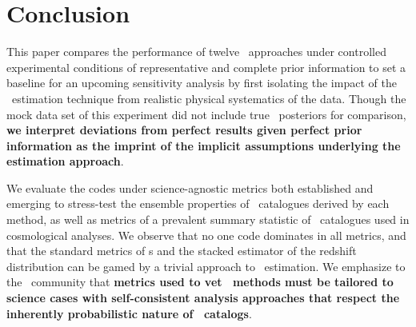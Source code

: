 \section{Conclusion}
\label{sec:conclusion}

This paper compares the performance of twelve \pzpdf\ approaches under controlled experimental conditions of representative and complete prior information to set a baseline for an upcoming sensitivity analysis by first isolating the impact of the \pzpdf\ estimation technique from realistic physical systematics of the data.
Though the mock data set of this experiment did not include true \pz\ posteriors for comparison, \textbf{we interpret deviations from perfect results given perfect prior information as the imprint of the implicit assumptions underlying the estimation approach}.

We evaluate the codes under science-agnostic metrics both established and emerging to stress-test the ensemble properties of \pzpdf\ catalogues derived by each method, as well as metrics of a prevalent summary statistic of \pzpdf\ catalogues used in cosmological analyses.
We observe that no one code dominates in all metrics, and that the standard metrics of \pzpdf s and the stacked estimator of the redshift distribution can be gamed by a trivial approach to \pzpdf\ estimation.
We emphasize to the \pz\ community that \textbf{metrics used to vet \pzpdf\ methods must be tailored to science cases with self-consistent analysis approaches that respect the inherently probabilistic nature of \pzpdf\ catalogs}.
